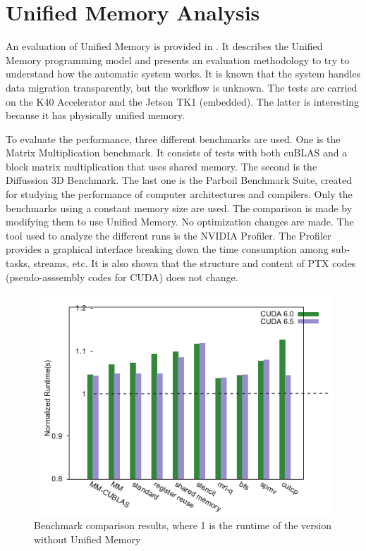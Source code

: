 
\section{Unified Memory Analysis \cite{li2015evaluation}} \label{subsec:unifmemanaly}
An evaluation of Unified Memory is provided in \cite{li2015evaluation}.
It describes the Unified Memory programming model and presents an evaluation methodology to try to understand how the automatic system works.
It is known that the system handles data migration transparently, but the workflow is unknown.
The tests are carried on the K40 Accelerator and the Jetson TK1 (embedded).
The latter is interesting because it has physically unified memory.

To evaluate the performance, three different benchmarks are used.
One is the Matrix Multiplication benchmark.
It consists of tests with both cuBLAS and a block matrix multiplication that uses shared memory.
The second is the Diffussion 3D Benchmark.
The last one is the Parboil Benchmark Suite, created for studying the performance of computer architectures and compilers.
Only the benchmarks using a constant memory size are used.
The comparison is made by modifying them to use Unified Memory.
No optimization changes are made.
The tool used to analyze the different runs is the NVIDIA Profiler.
The Profiler provides a graphical interface breaking down the time consumption among sub-tasks, streams, etc.
It is also shown that the structure and content of PTX codes (pseudo-asssembly codes for CUDA) does not change.

\begin{figure}[ht!]
    \centering
    \includegraphics[width=\linewidth]{unified_memory_benchmark_results}
    \caption{Benchmark comparison results, where 1 is the runtime of the version without Unified Memory \cite{li2015evaluation}}
    \label{fig:umem}
\end{figure}

